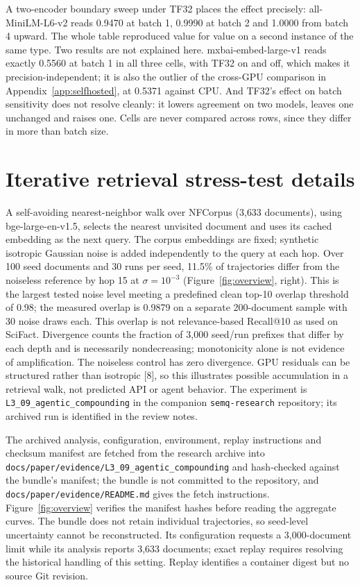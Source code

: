 \documentclass{article}
\begin{document}
A two-encoder boundary sweep under TF32 places the effect precisely: all-MiniLM-L6-v2 reads 0.9470 at batch 1, 0.9990 at batch 2 and 1.0000 from batch 4 upward. The whole table reproduced value for value on a second instance of the same type. Two results are not explained here. mxbai-embed-large-v1 reads exactly 0.5560 at batch 1 in all three cells, with TF32 on and off, which makes it precision-independent; it is also the outlier of the cross-GPU comparison in Appendix~\ref{app:selfhosted}, at 0.5371 against CPU. And TF32's effect on batch sensitivity does not resolve cleanly: it lowers agreement on two models, leaves one unchanged and raises one. Cells are never compared across rows, since they differ in more than batch size.

\section{Iterative retrieval stress-test details}\label{app:walk}

A self-avoiding nearest-neighbor walk over NFCorpus (3{,}633 documents), using bge-large-en-v1.5, selects the nearest unvisited document and uses its cached embedding as the next query. The corpus embeddings are fixed; synthetic isotropic Gaussian noise is added independently to the query at each hop. Over 100 seed documents and 30 runs per seed, 11.5\% of trajectories differ from the noiseless reference by hop 15 at $\sigma=10^{-3}$ (Figure~\ref{fig:overview}, right). This is the largest tested noise level meeting a predefined clean top-10 overlap threshold of 0.98; the measured overlap is 0.9879 on a separate 200-document sample with 30 noise draws each. This overlap is not relevance-based Recall@10 as used on SciFact. Divergence counts the fraction of 3{,}000 seed/run prefixes that differ by each depth and is necessarily nondecreasing; monotonicity alone is not evidence of amplification. The noiseless control has zero divergence. GPU residuals can be structured rather than isotropic [8], so this illustrates possible accumulation in a retrieval walk, not predicted API or agent behavior. The experiment is \texttt{L3\_09\_agentic\_compounding} in the companion \texttt{semq-research} repository; its archived run is identified in the review notes.

The archived analysis, configuration, environment, replay instructions and checksum manifest are fetched from the research archive into \texttt{docs/paper/evidence/L3\_09\_agentic\_compounding} and hash-checked against the bundle's manifest; the bundle is not committed to the repository, and \texttt{docs/paper/evidence/README.md} gives the fetch instructions. Figure~\ref{fig:overview} verifies the manifest hashes before reading the aggregate curves. The bundle does not retain individual trajectories, so seed-level uncertainty cannot be reconstructed. Its configuration requests a 3{,}000-document limit while its analysis reports 3{,}633 documents; exact replay requires resolving the historical handling of this setting. Replay identifies a container digest but no source Git revision.
\end{document}
